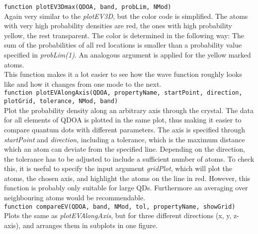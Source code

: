 \lstinline{function plotEV3Dmax(QDOA, band, probLim, NMod)}\\

Again very similar to the \textit{plotEV3D}, but the color code is simplified. The atoms with very high probability densities are red, the ones with high probability yellow, the rest transparent. The color is determined in the following way: The sum of the probabilities of all red locations is smaller than a probability value specified in \textit{probLim(1)}. An analogous argument is applied for the yellow marked atoms.\\
This function makes it a lot easier to see how the wave function roughly looks like and how it changes from one mode to the next.\\

\lstinline{function plotEVAlongAxis(QDOA, propertyName, startPoint, direction, plotGrid, tolerance, NMod, band)}\\

Plot the probability density along an arbitrary axis through the crystal. The data for all elements of QDOA is plotted in the same plot, thus making it easier to compare quantum dots with different parameters. The axis is specified through \textit{startPoint} and \textit{direction}, including a tolerance, which is  the maximum distance which an atom can deviate from the specified line. Depending on the direction, the tolerance has to be adjusted to include  a sufficient number of atoms. To check this, it is useful to specify the input argument \textit{gridPlot}, which will plot the atoms, the chosen axis, and highlight  the atoms on the line in red. However, this function is probably only suitable for large QDs. Furthermore an averaging over neighbouring atoms  would be recommendable.\\ 
 
\lstinline{function compareEV(QDOA, band, NMod, tol, propertyName, showGrid)}\\

Plots the same as \textit{plotEVAlongAxis}, but for three different directions (x, y, z-axis), and arranges them in subplots in one figure.

